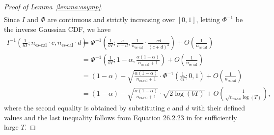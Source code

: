 \begin{proof}[Proof of Lemma~\ref{lemma:asymp}]
\begin{align*}
\end{align*}
Since $I$ and $\Phi$ are continuous and strictly increasing over $[0,1]$, letting $\Phi^{-1}$ be the inverse Gaussian CDF, we have
\begin{align*}
    I^{-1} \left(\frac{1}{bT};n_{\text{es-cal}}\cdot c, n_{\text{es-cal}}\cdot d \right) 
    &= \Phi^{-1} \left(\frac{1}{bT}; \frac{c}{c+d}, \frac{1}{n_{\text{es-cal}}} \cdot \frac{cd}{(c+d)^3} \right) + O\left( \frac{1}{n_{\text{es-cal}}} \right) \\
    &=\Phi^{-1} \left(\frac{1}{bT};1-\alpha, \frac{\alpha(1-\alpha)}{n_{\text{es-cal}}+1}
    \right) + O\left( \frac{1}{n_{\text{es-cal}}} \right)\\
    &=(1-\alpha) + \sqrt{\frac{\alpha(1-\alpha)}{n_{\text{es-cal}}+1}} \cdot \Phi^{-1} \left(\frac{1}{bT}; 0, 1\right) + O\left( \frac{1}{n_{\text{es-cal}}} \right) \\
    &= (1-\alpha) - \sqrt{\frac{\alpha(1-\alpha)}{n_{\text{es-cal}}+1}}\cdot \sqrt{2\log(bT)} + O\left( \frac{1}{\sqrt{n_{\text{es-cal}}\log(T)}} \right),
\end{align*}
where the second equality is obtained by substituting $c$ and $d$ with their defined values  and the last inequality follows from Equation 26.2.23 in \citet{book_a&s} for sufficiently large $T$.
\end{proof}

